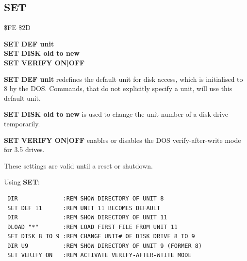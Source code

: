 \subsection{SET}
\begin{description}[leftmargin=2cm,style=nextline]
\item [Token:] \$FE \$2D
\item [Format:] {\bf SET DEF unit} \\
                {\bf SET DISK old to new} \\
                {\bf SET VERIFY ON|OFF}
\item [Usage:]  {\bf SET DEF unit} redefines the default unit
                for disk access, which is initialised to 8 by
                the DOS. Commands, that do not explicitly
                specify a unit, will use this default unit.

                {\bf SET DISK old to new} is used to change
                the unit number of a disk drive temporarily.

                {\bf SET VERIFY ON|OFF} enables or disables
                the DOS verify-after-write mode for
                3.5 drives.

\item [Remarks:] These settings are valid until a reset
                 or shutdown.

\item [Example:] Using {\bf SET}:
\begin{tcolorbox}[colback=black,coltext=white]
\verbatimfont{\codefont}
\begin{verbatim}
 DIR             :REM SHOW DIRECTORY OF UNIT 8
 SET DEF 11      :REM UNIT 11 BECOMES DEFAULT
 DIR             :REM SHOW DIRECTORY OF UNIT 11
 DLOAD "*"       :REM LOAD FIRST FILE FROM UNIT 11
 SET DISK 8 TO 9 :REM CHANGE UNIT# OF DISK DRIVE 8 TO 9
 DIR U9          :REM SHOW DIRECTORY OF UNIT 9 (FORMER 8)
 SET VERIFY ON   :REM ACTIVATE VERIFY-AFTER-WTITE MODE
\end{verbatim}
\end{tcolorbox}
\end{description}


\newpage

